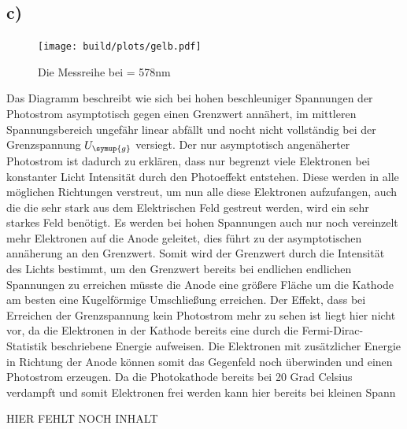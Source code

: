     \subsection{c)}

    \begin{figure}[H]
        \centering
        \texttt{[image: build/plots/gelb.pdf]}
        \caption{Die Messreihe bei \lambda = 578nm}
        \label{img:gelb}
    \end{figure}

    \noindent
    Das Diagramm beschreibt wie sich bei hohen beschleuniger Spannungen der Photostrom asymptotisch gegen einen Grenzwert annähert, im mittleren 
    Spannungsbereich ungefähr linear abfällt und nocht nicht vollständig bei der Grenzspannung $U_{\symup{g}}$ versiegt.
    Der nur asymptotisch angenäherter Photostrom ist dadurch zu erklären, dass nur begrenzt viele Elektronen bei konstanter Licht Intensität 
    durch den Photoeffekt entstehen. Diese werden in alle möglichen Richtungen verstreut, um nun alle diese Elektronen aufzufangen, auch die die sehr 
    stark aus dem Elektrischen Feld gestreut werden, wird ein sehr starkes Feld benötigt. Es werden bei hohen Spannungen auch nur noch vereinzelt
    mehr Elektronen auf die Anode geleitet, dies führt zu der asymptotischen annäherung an den Grenzwert. Somit wird der Grenzwert durch die 
    Intensität des Lichts bestimmt, um den Grenzwert bereits bei endlichen endlichen Spannungen zu erreichen müsste die Anode eine größere Fläche 
    um die Kathode am besten eine Kugelförmige Umschließung erreichen.
    Der Effekt, dass bei Erreichen der Grenzspannung kein Photostrom mehr zu sehen ist liegt hier nicht vor, da die Elektronen in der Kathode 
    bereits eine durch die Fermi-Dirac-Statistik beschriebene Energie aufweisen. Die Elektronen mit zusätzlicher Energie in Richtung der Anode 
    können somit das Gegenfeld noch überwinden und einen Photostrom erzeugen.
    Da die Photokathode bereits bei 20 Grad Celsius verdampft und somit Elektronen frei werden kann hier bereits bei kleinen Spann

    HIER FEHLT NOCH INHALT

